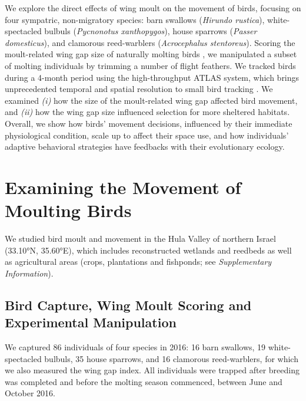 We explore the direct effects of wing moult on the movement of birds, focusing on four sympatric, non-migratory species: barn swallows (\textit{Hirundo rustica}), white-spectacled bulbuls (\textit{Pycnonotus xanthopygos}), house sparrows (\textit{Passer domesticus}), and clamorous reed-warblers (\textit{Acrocephalus stentoreus}).
Scoring the moult-related wing gap size of naturally molting birds \citep{lind2001,kiat2016}, we manipulated a subset of molting individuals by trimming a number of flight feathers.
We tracked birds during a 4-month period using the high-throughput ATLAS system, which brings unprecedented temporal and spatial resolution to small bird tracking \citep{toledo2014,weiser2016,toledo2020,nathan2022,beardsworth2022mee}.
We examined \textit{(i)} how the size of the moult-related wing gap affected bird movement, and \textit{(ii)} how the wing gap size influenced selection for more sheltered habitats.
Overall, we show how birds' movement decisions, influenced by their immediate physiological condition, scale up to affect their space use, and how individuals' adaptive behavioral strategies have feedbacks with their evolutionary ecology.

\section*{Examining the Movement of Moulting Birds}

We studied bird moult and movement in the Hula Valley of northern Israel (33.10°N, 35.60°E), which includes reconstructed wetlands and reedbeds as well as agricultural areas (crops, plantations and fishponds; see \textit{Supplementary Information}).

\subsection*{Bird Capture, Wing Moult Scoring and Experimental Manipulation}

We captured 86 individuals of four species in 2016: 16 barn swallows, 19 white-spectacled bulbuls, 35 house sparrows, and 16 clamorous reed-warblers, for which we also measured the wing gap index.
All individuals were trapped after breeding was completed and before the molting season commenced, between June and October 2016.

